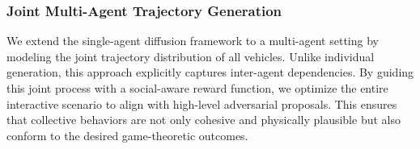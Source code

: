 \subsubsection{Joint Multi-Agent Trajectory Generation}
We extend the single-agent diffusion framework to a multi-agent setting by modeling the joint trajectory distribution of all vehicles. Unlike individual generation, this approach explicitly captures inter-agent dependencies. By guiding this joint process with a social-aware reward function, we optimize the entire interactive scenario to align with high-level adversarial proposals. This ensures that collective behaviors are not only cohesive and physically plausible but also conform to the desired game-theoretic outcomes.



